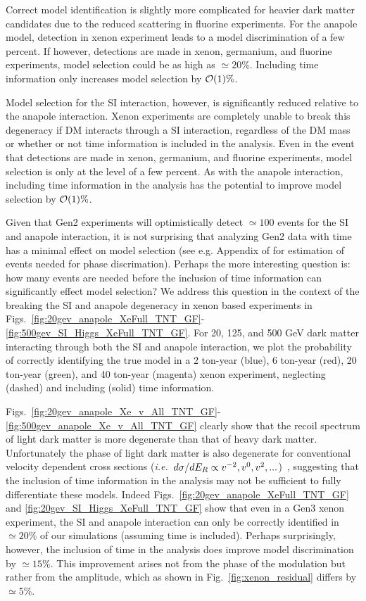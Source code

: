 \documentclass[11pt]{article}
\newcommand{\ie}{{\it i.e.~}}  \newcommand{\eg}{{\it e.g.~}}
\newcommand{\Fig}[1]{Fig.~\ref{#1}} \newcommand{\Figs}[2]{Figs.~\ref{#1} and \ref{#2}}
\begin{document}
Correct model identification is slightly more complicated for heavier dark matter candidates due to the reduced scattering in fluorine experiments. For the anapole model, detection in xenon experiment leads to a model discrimination of a few percent. If however, detections are made in xenon, germanium, and fluorine experiments, model selection could be as high as $\simeq 20 \%$. Including time information only increases model selection by ${\cal O}(1)\%$.  

Model selection for the SI interaction, however, is significantly reduced relative to the anapole interaction. Xenon experiments are completely unable to break this degeneracy if DM interacts through a SI interaction, regardless of the DM mass or whether or not time information is included in the analysis. Even in the event that detections are made in xenon, germanium, and fluorine experiments, model selection is only at the level of a few percent. As with the anapole interaction, including time information in the analysis has the potential to improve model selection by ${\cal O}(1)\%$. 

Given that Gen2 experiments will optimistically detect $\simeq 100$ events for the SI and anapole interaction, it is not surprising that analyzing Gen2 data with time has a minimal effect on model selection (see e.g. Appendix of \cite{} for estimation of events needed for phase discrimation). Perhaps the more interesting question is: how many events are needed before the inclusion of time information can significantly effect model selection? We address this question in the context of the breaking the SI and anapole degeneracy in xenon based experiments in Figs.~\ref{fig:20gev_anapole_XeFull_TNT_GF}-\ref{fig:500gev_SI_Higgs_XeFull_TNT_GF}. For 20, 125, and 500 GeV dark matter interacting through both the SI and anapole interaction, we plot the probability of correctly identifying the true model in a 2 ton-year (blue), 6 ton-year (red), 20 ton-year (green), and 40 ton-year (magenta) xenon experiment, neglecting (dashed) and including (solid) time information. 

Figs.~\ref{fig:20gev_anapole_Xe_v_All_TNT_GF}-\ref{fig:500gev_anapole_Xe_v_All_TNT_GF} clearly show that the recoil spectrum of light dark matter is more degenerate than that of heavy dark matter. Unfortunately the phase of light dark matter is also degenerate for conventional velocity dependent cross sections (\ie $d\sigma/dE_R \propto v^{-2}, v^0, v^2, ...$)~\cite{DelNobile:2015tza,DelNobile:2015rmp}, suggesting that the inclusion of time information in the analysis may not be sufficient to fully differentiate these models. Indeed \Figs{fig:20gev_anapole_XeFull_TNT_GF}{fig:20gev_SI_Higgs_XeFull_TNT_GF} show that even in a Gen3 xenon experiment, the SI and anapole interaction can only be correctly identified in $\simeq 20\%$ of our simulations (assuming time is included). Perhaps surprisingly, however, the inclusion of time in the analysis does improve model discrimination by $\simeq 15\%$. This improvement arises not from the phase of the modulation but rather from the amplitude, which as shown in \Fig{fig:xenon_residual} differs by $\simeq 5\%$.
\end{document}
